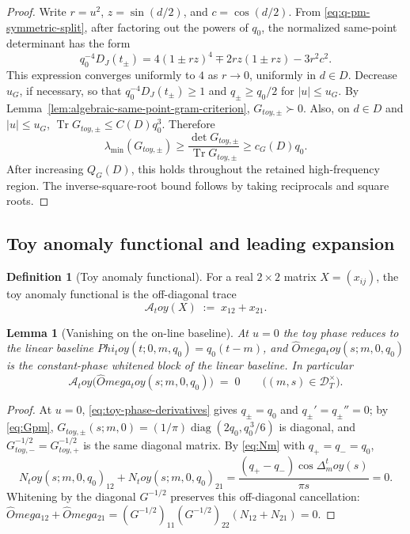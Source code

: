 \documentclass[11pt,a4paper]{amsart}
\def\Omega{Omega}%
\def\Phi{Phi}%
\def\toy{toy}%
\numberwithin{equation}{section}
\theoremstyle{plain}
\newtheorem{lemma}[theorem]{Lemma}
\theoremstyle{definition}
\newtheorem{definition}[theorem]{Definition}
\newcommand{\Om}{\Omega}
\newcommand{\Ph}{\Phi}
\newcommand{\Del}{\Delta}
\newcommand{\toy}{\mathrm{toy}}
\newcommand{\diag}{\operatorname{diag}}
\newcommand{\Tr}{\operatorname{Tr}}
\begin{document}
\begin{proof}
Write \(r=u^2\), \(z=\sin(d/2)\), and \(c=\cos(d/2)\).  From
\eqref{eq:q-pm-symmetric-split}, after factoring out the powers of
\(q_0\), the normalized same-point determinant has the form
\[
q_0^{-4}D_J(t_\pm)
=
4(1\pm rz)^4 \mp 2rz(1\pm rz)-3r^2c^2.
\]
This expression converges uniformly to \(4\) as \(r\to0\), uniformly in
\(d\in D\).  Decrease \(u_G\), if necessary, so that
\(q_0^{-4}D_J(t_\pm)\ge 1\) and \(q_\pm\ge q_0/2\) for
\(|u|\le u_G\).  By Lemma~\ref{lem:algebraic-same-point-gram-criterion},
\(G_{\toy,\pm}\succ0\).  Also, on \(d\in D\) and \(|u|\le u_G\),
\(\Tr G_{\toy,\pm}\le C(D)q_0^3\).  Therefore
\[
\lambda_{\min}(G_{\toy,\pm})
\ge \frac{\det G_{\toy,\pm}}{\Tr G_{\toy,\pm}}
\ge c_G(D)q_0.
\]
After increasing \(Q_G(D)\), this holds throughout the retained
high-frequency region.  The inverse-square-root bound follows by taking
reciprocals and square roots.
\end{proof}

\subsection{Toy anomaly functional and leading expansion}
\label{subsec:toy-anomaly-functional}

\begin{definition}[Toy anomaly functional]
\label{def:toy-anomaly-functional}
For a real \(2\times 2\) matrix \(X=(x_{ij})\), the toy anomaly
functional is the off-diagonal trace
\begin{equation}
\label{eq:toy-anomaly-functional}
\mathcal A_\toy(X)\;:=\;x_{12}+x_{21}.
\end{equation}
\end{definition}

\begin{lemma}[Vanishing on the on-line baseline]
\label{lem:A-toy-baseline-vanishing}
At \(u=0\) the toy phase reduces to the linear baseline
\(\Ph_\toy(t;0,m,q_0)=q_0(t-m)\), and \(\widehat\Om_\toy(s;m,0,q_0)\) is
the constant-phase whitened block of the linear baseline.  In
particular
\begin{equation}
\label{eq:A-toy-baseline}
        \mathcal A_\toy\bigl(\widehat\Om_\toy(s;m,0,q_0)\bigr)\;=\;0
        \qquad\bigl((m,s)\in\mathcal D_T^\times\bigr).
\end{equation}
\end{lemma}

\begin{proof}
At \(u=0\), \eqref{eq:toy-phase-derivatives} gives \(q_\pm=q_0\) and
\(q_\pm'=q_\pm''=0\); by \eqref{eq:Gpm},
\(G_{\toy,\pm}(s;m,0)=(1/\pi)\diag(2q_0,q_0^{\,3}/6)\) is diagonal,
and \(G_{\toy,-}^{-1/2}=G_{\toy,+}^{-1/2}\) is the same diagonal
matrix.  By \eqref{eq:Nm} with \(q_+=q_-=q_0\),
\[
N_\toy(s;m,0,q_0)_{12}+N_\toy(s;m,0,q_0)_{21}
=\frac{(q_+-q_-)\cos\Del_m^\toy(s)}{\pi s}=0.
\]
Whitening by the diagonal \(G^{-1/2}\) preserves this off-diagonal
cancellation: \(\widehat\Om_{12}+\widehat\Om_{21}
=(G^{-1/2})_{11}(G^{-1/2})_{22}(N_{12}+N_{21})=0\).
\end{proof}
\end{document}
